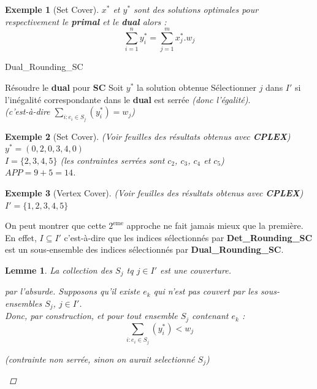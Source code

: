 \documentclass{article}
\newcommand{\titre}[1]{\textcolor{title}{#1}}
\newtheorem{exemple}{Exemple}[section]
\newtheorem{lemme}{Lemme}[section]
\newtheorem{proof}{Preuve}[section]
\begin{document}
\begin{sffamily}
\begin{exemple}[Set Cover]
$x^*$ et $y^*$ sont des solutions optimales pour respectivement le \textbf{primal} et le \textbf{dual} alors :
$$ \sum_{i=1}^n y^*_i = \sum_{j=1}^m x^*_j.w_j$$
\end{exemple}

\begin{algorithm}[h!]
\caption{Dual\_Rounding\_SC}
\begin{algorithmic}[1]
\STATE Résoudre le \textbf{dual} pour \textbf{\titre{SC}}
\STATE Soit $y^*$ la solution obtenue
\STATE Sélectionner $j$ dans $I'$ si l'inégalité correspondante dans le \textbf{dual} est serrée \textit{(donc l'égalité)}.\\
\textit{(c'est-à-dire $\sum_{i : e_i \in S_j} (y^*_i) = w_j$)}
\end{algorithmic}
\end{algorithm}

\begin{exemple}[Set Cover] (Voir feuilles des résultats obtenus avec \textbf{CPLEX}) \\
$y^* = (0,2,0,3,4,0)$ \\
$I = \{2,3,4,5\}$ (les contraintes serrées sont $c_2$, $c_3$, $c_4$ et $c_5$)\\
$APP=9+5=14$.
\end{exemple}

\begin{exemple}[Vertex Cover] (Voir feuilles des résultats obtenus avec \textbf{CPLEX}) \\
$I' = \{1,2,3,4,5\}$
\end{exemple}

On peut montrer que cette $2^{\text{eme}}$ approche ne fait jamais mieux que la première. En effet, $I \subseteq I'$ c'est-à-dire que les
indices sélectionnés par \textbf{Det\_Rounding\_SC} est un sous-ensemble des indices sélectionnés par \textbf{Dual\_Rounding\_SC}.

\begin{lemme}
La collection des $S_j$ tq $j\in I'$ est une couverture.$ $\\
\begin{proof}[par l'absurde]
Supposons qu'il existe $e_k$ qui n'est pas couvert par les sous-ensembles $S_j$, $j\in I'$.\\
Donc, par construction, et pour tout ensemble $S_j$ contenant $e_k$ :
$$\sum_{i : e_i \in S_j}(y^*_i) < w_j $$
\begin{center}
\textit{(contrainte non serrée, sinon on aurait selectionné $S_j$)}
\end{center}


\end{proof}
\end{lemme}
\end{sffamily}
\end{document}
